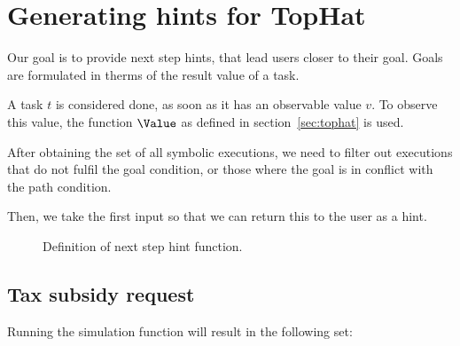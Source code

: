 
\section{Generating hints for TopHat}
\label{sec:assistive}

Our goal is to provide next step hints, that lead users closer to their goal.
Goals are formulated in therms of the result value of a task.

A task $t$ is considered done, as soon as it has an observable value $v$.
To observe this value, the function $\Value$ as defined in section~\ref{sec:tophat} is used.

After obtaining the set of all symbolic executions, we need to filter out executions that do not fulfil the goal condition, or those where the goal is in conflict with the path condition.

Then, we take the first input so that we can return this to the user as a hint.

\begin{figure}
  \caption{Definition of next step hint function.}
  \label{}
\end{figure}


\subsection{Tax subsidy request}

Running the simulation function will result in the following set:


